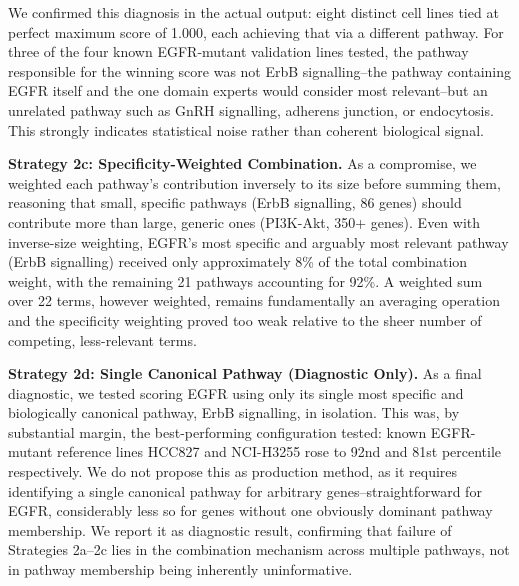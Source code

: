 \documentclass[author={Karen Coutinho, Ishaan Bhalla, Aman Raj, Dixit Kaloorani Malarmannan},
                supervisor={Dr. Daniel D'Andrea},
                degree={MSc},
                title={CellSelector Omics: A Multi-Omics Recommendation System for Cell Line Selection},
                subtitle={},
                type={},
                year={2026}]{dissertation}
\begin{document}
We confirmed this diagnosis in the actual output: eight distinct cell lines tied at perfect maximum score of 1.000, each achieving that via a different pathway. For three of the four known EGFR-mutant validation lines tested, the pathway responsible for the winning score was not ErbB signalling--the pathway containing EGFR itself and the one domain experts would consider most relevant--but an unrelated pathway such as GnRH signalling, adherens junction, or endocytosis. This strongly indicates statistical noise rather than coherent biological signal.

{\bf Strategy 2c: Specificity-Weighted Combination.} As a compromise, we weighted each pathway's contribution inversely to its size before summing them, reasoning that small, specific pathways (ErbB signalling, 86 genes) should contribute more than large, generic ones (PI3K-Akt, 350+ genes). Even with inverse-size weighting, EGFR's most specific and arguably most relevant pathway (ErbB signalling) received only approximately 8\% of the total combination weight, with the remaining 21 pathways accounting for 92\%. A weighted sum over 22 terms, however weighted, remains fundamentally an averaging operation and the specificity weighting proved too weak relative to the sheer number of competing, less-relevant terms.

{\bf Strategy 2d: Single Canonical Pathway (Diagnostic Only).} As a final diagnostic, we tested scoring EGFR using only its single most specific and biologically canonical pathway, ErbB signalling, in isolation. This was, by substantial margin, the best-performing configuration tested: known EGFR-mutant reference lines HCC827 and NCI-H3255 rose to 92nd and 81st percentile respectively. We do not propose this as production method, as it requires identifying a single canonical pathway for arbitrary genes--straightforward for EGFR, considerably less so for genes without one obviously dominant pathway membership. We report it as diagnostic result, confirming that failure of Strategies 2a–2c lies in the combination mechanism across multiple pathways, not in pathway membership being inherently uninformative.
\end{document}
